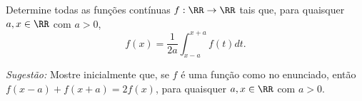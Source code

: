 Determine todas as funções contínuas $f : \RR \to \RR$ tais que, para quaisquer $a, x \in \RR$ com $a > 0$, $$f(x) = \frac{1}{2a} \int_{x-a}^{x+a} f(t)dt.$$
	
\textit{Sugestão:} Mostre inicialmente que, se $f$ é uma função como no enunciado, então $f(x-a) + f(x+a) = 2f(x)$, para quaisquer $a, x \in \RR$ com $a > 0$.
